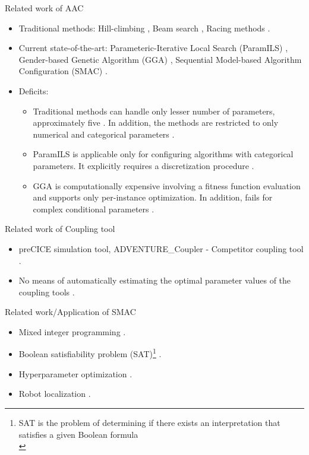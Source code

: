\documentclass[10pt]{beamer}
\begin{document}
\begin{frame}{Related work of AAC}

\begin{itemize}
\item Traditional methods: Hill-climbing \cite{Gratch_1992}, Beam search \cite{Minton_1993}, Racing methods \cite{FRace_paper} \cite{IFRace_paper}.
\newline
\item Current state-of-the-art: Parameteric-Iterative Local Search (ParamILS) \cite{ParamILS_mainpaper}, Gender-based Genetic Algorithm (GGA) \cite{GGA_paper}, Sequential Model-based Algorithm Configuration (SMAC) \cite{SMAC_mainpaper}.
\newline
\item Deficits:
\begin{itemize}
\item Traditional methods can handle only lesser number of parameters, approximately five \cite{Gratch_1992} \cite{Minton_1993}. In addition, the methods are restricted to only numerical and categorical parameters \cite{AAC_Mainreview}. 
\newline
\item ParamILS is applicable only for configuring algorithms with categorical parameters. It explicitly requires a discretization procedure \cite{ParamILS_mainpaper}.
\newline
\item GGA is computationally expensive involving a fitness function evaluation and supports only per-instance optimization. In addition, fails for complex conditional parameters \cite{SMAC_ParamILS_GGA_compare}.
\end{itemize}
\end{itemize}
\end{frame}

\begin{frame}[t]{Related work of Coupling tool}
\begin{itemize}
    \item preCICE simulation tool, ADVENTURE\_Coupler - Competitor coupling tool \cite{FSI_Bungartz}.
    \newline
    \item No means of automatically estimating the optimal parameter values of the coupling tools \cite{FSICartesiangrid}.
\end{itemize}
\end{frame}


\begin{frame}[t]{Related work/Application of SMAC}
\begin{itemize}
\item Mixed integer programming \cite{SMAC_mainpaper}.
\item Boolean satisfiability problem (SAT)\footnote{SAT is the problem of determining if there exists an interpretation that satisfies a given Boolean formula\\} \cite{SMAC_mainpaper}.
\item Hyperparameter optimization \cite{hponn}.
\item Robot localization \cite{OscarLima_SMAC}.
\end{itemize}
\end{frame}
\end{document}
